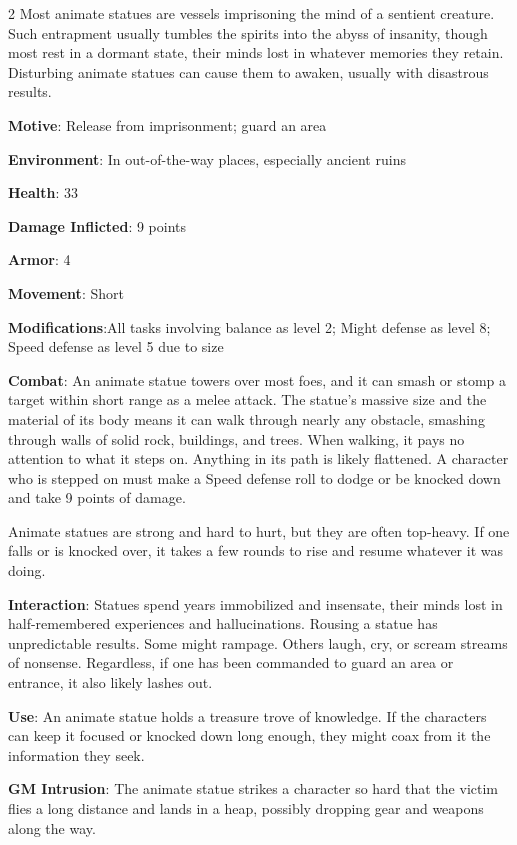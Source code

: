 \begin{multicols}{2}
Most animate statues are vessels imprisoning the mind of a sentient creature. Such entrapment usually tumbles the spirits into the abyss of insanity, though most rest in a dormant state, their minds lost in whatever memories they retain. Disturbing animate statues can cause them to awaken, usually with disastrous results.

\textbf{Motive}: Release from imprisonment; guard an area

\textbf{Environment}: In out-of-the-way places, especially ancient ruins

\textbf{Health}: 33

\textbf{Damage Inflicted}: 9 points

\textbf{Armor}: 4

\textbf{Movement}: Short

\textbf{Modifications}:All tasks involving balance as level 2; Might defense as level 8; Speed defense as level 5 due to size

\textbf{Combat}: An animate statue towers over most foes, and it can smash or stomp a target within short range as a melee attack. The statue’s massive size and the material of its body means it can walk through nearly any obstacle, smashing through walls of solid rock, buildings, and trees. When walking, it pays no attention to what it steps on. Anything in its path is likely flattened. A character who is stepped on must make a Speed defense roll to dodge or be knocked down and take 9 points of damage.

Animate statues are strong and hard to hurt, but they are often top-heavy. If one falls or is knocked over, it takes a few rounds to rise and resume whatever it was doing.

\textbf{Interaction}: Statues spend years immobilized and insensate, their minds lost in half-remembered experiences and hallucinations. Rousing a statue has unpredictable results. Some might rampage. Others laugh, cry, or scream streams of nonsense. Regardless, if one has been commanded to guard an area or entrance, it also likely lashes out.

\textbf{Use}: An animate statue holds a treasure trove of knowledge. If the characters can keep it focused or knocked down long enough, they might coax from it the information they seek.

\textbf{GM Intrusion}: The animate statue strikes a character so hard that the victim flies a long distance and lands in a heap, possibly dropping gear and weapons along the way.


\end{multicols}
